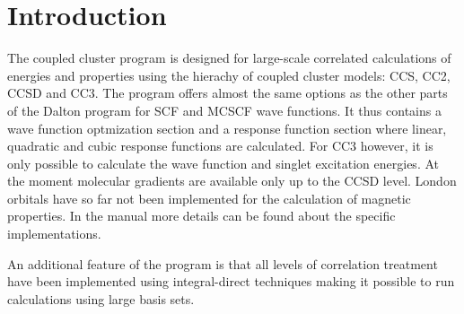 \chapter{Introduction}\label{ch:cc_intro}

The coupled cluster program is designed for large-scale
correlated calculations of energies and properties using the
hierachy of coupled cluster models: CCS, CC2, CCSD and CC3.
The program offers almost the same options as the other
parts of the Dalton program for SCF and MCSCF wave functions.
It thus contains a wave function optmization section and a response function section
where linear, quadratic and cubic response functions are calculated.
For CC3 however, it is only possible to calculate the wave function and 
singlet excitation energies. At the moment molecular gradients are available 
only up to the CCSD level.  London orbitals have so far not been implemented 
for the calculation of magnetic properties. 
In the manual more details can be found about the specific implementations.

An additional feature of the program is that all levels of correlation
treatment have been implemented using integral-direct techniques making
it possible to run calculations using large basis sets.  


